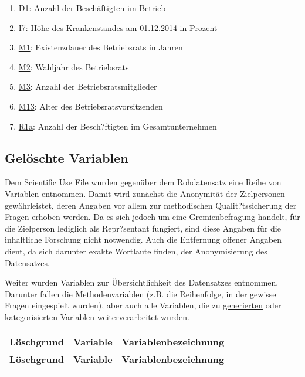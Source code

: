 \begin{enumerate}

\item \hyperref[var:D1]{D1}: Anzahl der Beschäftigten im Betrieb 
\item \hyperref[var:I7]{I7}: Höhe des Krankenstandes am 01.12.2014 in Prozent
\item \hyperref[var:M1]{M1}: Existenzdauer des Betriebsrats in Jahren
\item \hyperref[var:M2]{M2}: Wahljahr des Betriebsrats
\item \hyperref[var:M3]{M3}: Anzahl der Betriebsratsmitglieder
\item \hyperref[var:M13]{M13}: Alter des Betriebsratsvorsitzenden
\item \hyperref[var:R1a]{R1a}: Anzahl der Besch?ftigten im Gesamtunternehmen

\end{enumerate}

\subsection{Gelöschte Variablen}\label{var_geloescht}

Dem Scientific Use File wurden gegenüber dem Rohdatensatz eine Reihe von Variablen entnommen. Damit wird zunächst die Anonymität der Zielpersonen gewährleistet, deren Angaben vor allem zur methodischen Qualit?tssicherung der Fragen erhoben werden. Da es sich jedoch um eine Gremienbefragung handelt, für die Zielperson lediglich als Repr?sentant fungiert, sind diese Angaben für die inhaltliche Forschung nicht notwendig. Auch die Entfernung offener Angaben dient, da sich darunter exakte Wortlaute finden, der Anonymisierung des Datensatzes. 

Weiter wurden Variablen zur Übersichtlichkeit des Datensatzes entnommen. Darunter fallen die Methodenvariablen (z.B. die Reihenfolge, in der gewisse Fragen eingespielt wurden), aber auch alle Variablen, die zu \hyperref[var_generiert]{generierten} oder \hyperref[var_kategorisiert]{kategorisierten} Variablen weiterverarbeitet wurden.

\begin{longtable}{!{\color{black}\vline width 1pt} L{2.5cm} !{\color{black}\vline width 1pt} L{2.5cm} | L{11.75cm} !{\color{black}\vline width 1pt}  }
	
	\toprule
	\textbf{Löschgrund} & \textbf{Variable} & \textbf{Variablenbezeichnung}  \\ 
	\midrule
	\endfirsthead

	\toprule
		\textbf{Löschgrund} & \textbf{Variable} & \textbf{Variablenbezeichnung}  \\ 
	\midrule
	\endhead
	
	\midrule
	
	\endfoot
	\bottomrule
	\endlastfoot
		
	
	
\end{longtable}

